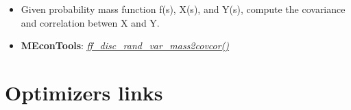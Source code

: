 \documentclass[
]{book}
\providecommand{\tightlist}{%
  \setlength{\itemsep}{0pt}\setlength{\parskip}{0pt}}
\begin{document}
\begin{enumerate}
  \begin{itemize}
  \tightlist
  \item
    Given probability mass function f(s), X(s), and Y(s), compute the covariance and correlation betwen X and Y.
  \item
    \textbf{MEconTools}: \emph{\href{https://github.com/FanWangEcon/MEconTools/blob/master/MEconTools/stats/ff_disc_rand_var_mass2covcor.m}{ff\_disc\_rand\_var\_mass2covcor()}}
  \end{itemize}
\end{enumerate}

\hypertarget{optimizers-links}{%
\section{Optimizers links}\label{optimizers-links}}
\end{document}
